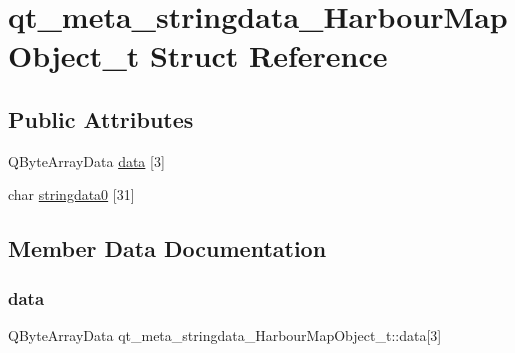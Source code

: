 \hypertarget{structqt__meta__stringdata___harbour_map_object__t}{}\section{qt\+\_\+meta\+\_\+stringdata\+\_\+\+Harbour\+Map\+Object\+\_\+t Struct Reference}
\label{structqt__meta__stringdata___harbour_map_object__t}
\subsection*{Public Attributes}
\begin{DoxyCompactItemize}
\item 
Q\+Byte\+Array\+Data \mbox{\hyperlink{structqt__meta__stringdata___harbour_map_object__t_a6a958cba9bf0804c56dfd0e3388aa68f}{data}} \mbox{[}3\mbox{]}
\item 
char \mbox{\hyperlink{structqt__meta__stringdata___harbour_map_object__t_a10709775f73ae546de2022af7781d9f6}{stringdata0}} \mbox{[}31\mbox{]}
\end{DoxyCompactItemize}


\subsection{Member Data Documentation}
\mbox{\label{structqt__meta__stringdata___harbour_map_object__t_a6a958cba9bf0804c56dfd0e3388aa68f}} 
\subsubsection{\texorpdfstring{data}{data}}
{\footnotesize\ttfamily Q\+Byte\+Array\+Data qt\+\_\+meta\+\_\+stringdata\+\_\+\+Harbour\+Map\+Object\+\_\+t\+::data\mbox{[}3\mbox{]}}

\mbox{\label{structqt__meta__stringdata___harbour_map_object__t_a10709775f73ae546de2022af7781d9f6}} 
